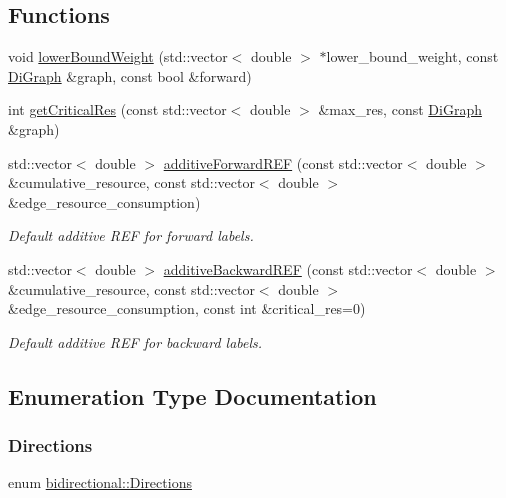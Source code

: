\subsection*{Functions}
\begin{DoxyCompactItemize}
\item 
void \hyperlink{namespacebidirectional_a35feb503e8ae674a3756aebc9a3b1d0f}{lower\+Bound\+Weight} (std\+::vector$<$ double $>$ $\ast$lower\+\_\+bound\+\_\+weight, const \hyperlink{classbidirectional_1_1DiGraph}{Di\+Graph} \&graph, const bool \&forward)
\item 
int \hyperlink{namespacebidirectional_a7b92b2282139801a9e2668a743ad07a1}{get\+Critical\+Res} (const std\+::vector$<$ double $>$ \&max\+\_\+res, const \hyperlink{classbidirectional_1_1DiGraph}{Di\+Graph} \&graph)
\item 
std\+::vector$<$ double $>$ \hyperlink{namespacebidirectional_a6b3d052fd58c8158b4e7a79acbed3c0e}{additive\+Forward\+R\+EF} (const std\+::vector$<$ double $>$ \&cumulative\+\_\+resource, const std\+::vector$<$ double $>$ \&edge\+\_\+resource\+\_\+consumption)
\begin{DoxyCompactList}\small\item\em Default additive R\+EF for forward labels. \end{DoxyCompactList}\item 
std\+::vector$<$ double $>$ \hyperlink{namespacebidirectional_a36f100766b94f6950283274ff7d4e7a6}{additive\+Backward\+R\+EF} (const std\+::vector$<$ double $>$ \&cumulative\+\_\+resource, const std\+::vector$<$ double $>$ \&edge\+\_\+resource\+\_\+consumption, const int \&critical\+\_\+res=0)
\begin{DoxyCompactList}\small\item\em Default additive R\+EF for backward labels. \end{DoxyCompactList}\end{DoxyCompactItemize}


\subsection{Enumeration Type Documentation}
\mbox{\label{namespacebidirectional_a4cbe6f0bfbd3629c2cd44c98014aed70}} 
\subsubsection{\texorpdfstring{Directions}{Directions}}
{\footnotesize\ttfamily enum \hyperlink{namespacebidirectional_a4cbe6f0bfbd3629c2cd44c98014aed70}{bidirectional\+::\+Directions}}



